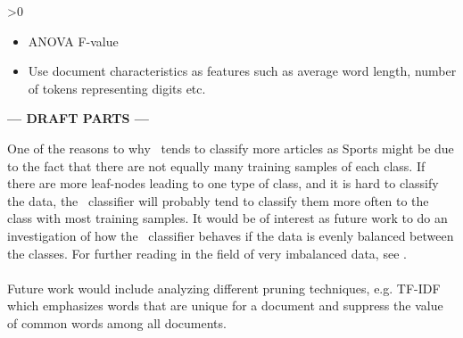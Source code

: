 \ifnum\printdraft>0
	\begin{itemize}
		\item ANOVA F-value
		\item Use document characteristics as features such as average word length, number of tokens representing digits etc.
	\end{itemize}
\else
\begin{center}
	\textbf{--- DRAFT PARTS ---}
\end{center}
\fi

One of the reasons to why \rf\ tends to classify more articles as Sports might be due to the fact that there are not equally many training samples of each class. If there are more leaf-nodes leading to one type of class, and it is hard to classify the data, the \rf\ classifier will probably tend to classify them more often to the class with most training samples. It would be of interest as future work to do an investigation of how the \rf\ classifier behaves if the data is evenly balanced between the classes. For further reading in the field of very imbalanced data, see \cite{Chen}.
\\\\
Future work would include analyzing different pruning techniques, e.g. TF-IDF which emphasizes words that are unique for a document and suppress the value of common words among all documents. 
